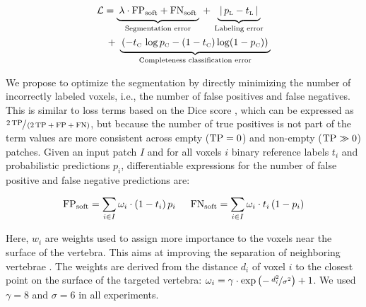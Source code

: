 \documentclass[authoryear,5p,final,times]{elsarticle}
\begin{document}
    \begin{equation*}
        \begin{aligned}
            \mathcal{L} & =
            \underbrace{\strut \:\lambda \cdot \textnormal{FP}_{\textnormal{soft}} + \textnormal{FN}_{\textnormal{soft}}\:}_\text{Segmentation error}
            \:+\:
            \underbrace{\strut \:|\, p_\textnormal{\tiny L} - t_\textnormal{\tiny L}\, |\:}_\text{Labeling error}
            \\ &
            \:+\:
            \underbrace{\strut \left(-t_\textnormal{\tiny C} \, \log p_\textnormal{\tiny C} - (1 - t_\textnormal{\tiny C}) \log (1 - p_\textnormal{\tiny C})\right)\:}_\text{Completeness classification error}
        \end{aligned}
    \end{equation*}
    
    We propose to optimize the segmentation by directly minimizing the number of incorrectly labeled voxels, i.e., the number of false positives and false negatives. This is similar to loss terms based on the Dice score \citep{Milletari2016}, which can be expressed as $\sfrac{2\,\textnormal{TP}}{\left(2\,\textnormal{TP} + \textnormal{FP} + \textnormal{FN}\right)}$, but because the number of true positives is not part of the term values are more consistent across empty ($\textnormal{TP} = 0$) and non-empty ($\textnormal{TP} \gg 0$) patches. Given an input patch $I$ and for all voxels $i$ binary reference labels $t_i$ and probabilistic predictions $p_i$, differentiable expressions for the number of false positive and false negative predictions are:
    
    \begin{equation*}
        \textnormal{FP}_{\textnormal{soft}} = \sum_{i \in I} \omega_{i} \cdot (1 - t_{i}) \, p_{i}
        \quad\enspace
        \textnormal{FN}_{\textnormal{soft}} = \sum_{i \in I} \omega_{i} \cdot t_{i} \, (1 - p_{i})
    \end{equation*}
    
    \noindent
    Here, $w_i$ are weights used to assign more importance to the voxels near the surface of the vertebra. This aims at improving the separation of neighboring vertebrae \citep{Ronneberger2015}. The weights are derived from the distance $d_i$ of voxel $i$ to the closest point on the surface of the targeted vertebra: $
        \omega_i = \gamma \cdot \exp \left( -\, \nicefrac{d_i^2}{\sigma^2} \right) + 1
    $. We used $\gamma = 8$ and $\sigma = 6$ in all experiments.
    
\end{document}
